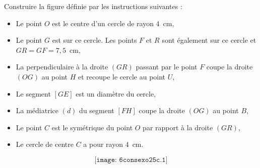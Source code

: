 Construire la figure définie par les instructions suivantes :
\begin{itemize}
\item Le point $O$ est le centre d'un cercle de rayon 4~cm,
\item Le point $G$ est sur ce cercle. Les points $F$ et $R$ sont
également sur ce cercle et $GR = GF=7,5$~cm,
\item La perpendiculaire à la droite $(GR)$ passant par le point $F$
coupe la droite $(OG)$ au point $H$ et recoupe le cercle au point $U$,
\item Le segment $[GE]$ est un diamètre du cercle,
\item La médiatrice $(d)$ du segment $[FH]$ coupe la droite $(OG)$ au
point $B$,
\item Le point $C$ est le symétrique du point $O$ par rapport à la
droite $(GR)$,
\item Le cercle de centre $C$ a pour rayon 4~cm.
\end{itemize}
\[\texttt{[image: 6consexo25c.1]}\]